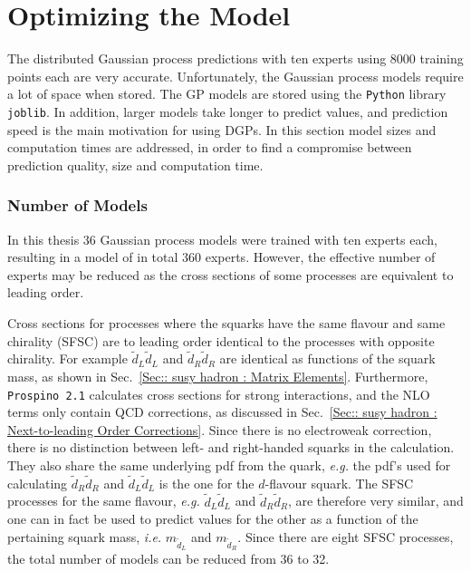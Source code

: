 \documentclass[twoside,english]{uiofysmaster}
\begin{document}
{{\section{Optimizing the Model}\label{Sec:: results : The Optimal Model}

The distributed Gaussian process predictions with ten experts using 8000 training points each are very accurate. Unfortunately, the Gaussian process models require a lot of space when stored. The GP models are stored using the \verb|Python| library \verb|joblib|. In addition, larger models take longer to predict values, and prediction speed is the main motivation for using DGPs. In this section model sizes and computation times are addressed, in order to find a compromise between prediction quality, size and computation time.

\subsubsection{Number of Models}

In this thesis 36 Gaussian process models were trained with ten experts each, resulting in a model of in total 360 experts. However, the effective number of experts may be reduced as the cross sections of some processes are equivalent to leading order. 


Cross sections for processes where the squarks have the same flavour and same chirality (SFSC) are to leading order identical to the processes with opposite chirality. For example $\widetilde{d}_L \widetilde{d}_L$ and $\widetilde{d}_R \widetilde{d}_R$ are identical as functions of the squark mass, as shown in Sec.~\ref{Sec:: susy hadron : Matrix Elements}. Furthermore, \verb|Prospino 2.1| calculates cross sections for strong interactions, and the NLO terms only contain QCD corrections, as discussed in Sec.~\ref{Sec:: susy hadron : Next-to-leading Order Corrections}. Since there is no electroweak correction, there is no distinction between left- and right-handed squarks in the calculation. They also share the same underlying pdf from the quark, \textit{e.g.} the pdf's used for calculating $\widetilde{d}_R \widetilde{d}_R$ and $\widetilde{d}_L \widetilde{d}_L$ is the one for the $d$-flavour squark. The SFSC processes for the same flavour, \textit{e.g.} $\widetilde{d}_L \widetilde{d}_L$ and $\widetilde{d}_R \widetilde{d}_R$, are therefore very similar, and one can in fact be used to predict values for the other as a function of the pertaining squark mass, \textit{i.e.} $m_{\widetilde{d}_L}$ and $m_{\widetilde{d}_R}$. Since there are eight SFSC processes, the total number of models can be reduced from 36 to 32.

}}
\end{document}
